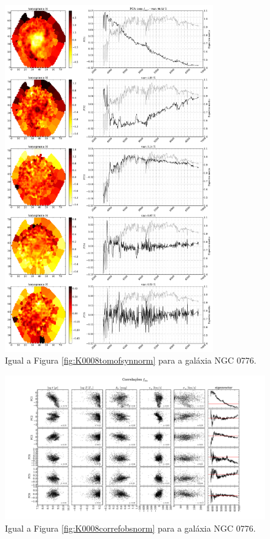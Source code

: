 \begin{figure}
    \includegraphics[width=0.8\textwidth]{figuras/K0073-tomo-syn-norm.pdf}
    \caption[Tomogramas de 1 a 5 para o cubo $f_{syn}$ - NGC 0776.]
    {Igual a Figura \ref{fig:K0008tomofsynnorm} para a galáxia NGC 0776.}
    \label{fig:K0073tomofsynnorm}
\end{figure}

\begin{figure}
    \includegraphics[width=1.3\textwidth, angle=-90]{figuras/K0073-correl-f_obs_norm-PCvsPhys.pdf}
	\caption[Correlações PCs vs. par\^ametros f\'isicos - $f_{obs}$ - NGC 0001]
	{Igual a Figura \ref{fig:K0008correfobsnorm} para a galáxia NGC 0776.}
    \label{fig:K0073correfobsnorm}
\end{figure}

